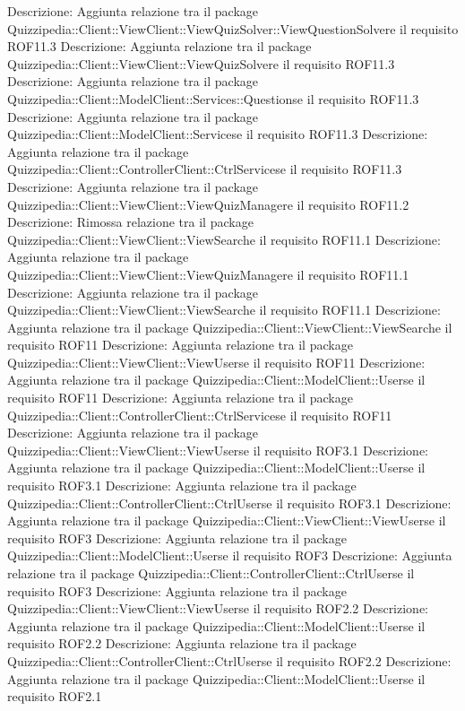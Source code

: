 Descrizione: Aggiunta relazione tra il package Quizzipedia::Client::ViewClient::ViewQuizSolver::ViewQuestionSolvere il requisito ROF11.3 
Descrizione: Aggiunta relazione tra il package Quizzipedia::Client::ViewClient::ViewQuizSolvere il requisito ROF11.3 
Descrizione: Aggiunta relazione tra il package Quizzipedia::Client::ModelClient::Services::Questionse il requisito ROF11.3 
Descrizione: Aggiunta relazione tra il package Quizzipedia::Client::ModelClient::Servicese il requisito ROF11.3 
Descrizione: Aggiunta relazione tra il package Quizzipedia::Client::ControllerClient::CtrlServicese il requisito ROF11.3 
Descrizione: Aggiunta relazione tra il package Quizzipedia::Client::ViewClient::ViewQuizManagere il requisito ROF11.2 
Descrizione: Rimossa relazione tra il package Quizzipedia::Client::ViewClient::ViewSearche il requisito ROF11.1 
Descrizione: Aggiunta relazione tra il package Quizzipedia::Client::ViewClient::ViewQuizManagere il requisito ROF11.1 
Descrizione: Aggiunta relazione tra il package Quizzipedia::Client::ViewClient::ViewSearche il requisito ROF11.1 
Descrizione: Aggiunta relazione tra il package Quizzipedia::Client::ViewClient::ViewSearche il requisito ROF11 
Descrizione: Aggiunta relazione tra il package Quizzipedia::Client::ViewClient::ViewUserse il requisito ROF11 
Descrizione: Aggiunta relazione tra il package Quizzipedia::Client::ModelClient::Userse il requisito ROF11 
Descrizione: Aggiunta relazione tra il package Quizzipedia::Client::ControllerClient::CtrlServicese il requisito ROF11 
Descrizione: Aggiunta relazione tra il package Quizzipedia::Client::ViewClient::ViewUserse il requisito ROF3.1 
Descrizione: Aggiunta relazione tra il package Quizzipedia::Client::ModelClient::Userse il requisito ROF3.1 
Descrizione: Aggiunta relazione tra il package Quizzipedia::Client::ControllerClient::CtrlUserse il requisito ROF3.1 
Descrizione: Aggiunta relazione tra il package Quizzipedia::Client::ViewClient::ViewUserse il requisito ROF3 
Descrizione: Aggiunta relazione tra il package Quizzipedia::Client::ModelClient::Userse il requisito ROF3 
Descrizione: Aggiunta relazione tra il package Quizzipedia::Client::ControllerClient::CtrlUserse il requisito ROF3 
Descrizione: Aggiunta relazione tra il package Quizzipedia::Client::ViewClient::ViewUserse il requisito ROF2.2 
Descrizione: Aggiunta relazione tra il package Quizzipedia::Client::ModelClient::Userse il requisito ROF2.2 
Descrizione: Aggiunta relazione tra il package Quizzipedia::Client::ControllerClient::CtrlUserse il requisito ROF2.2 
Descrizione: Aggiunta relazione tra il package Quizzipedia::Client::ModelClient::Userse il requisito ROF2.1 
